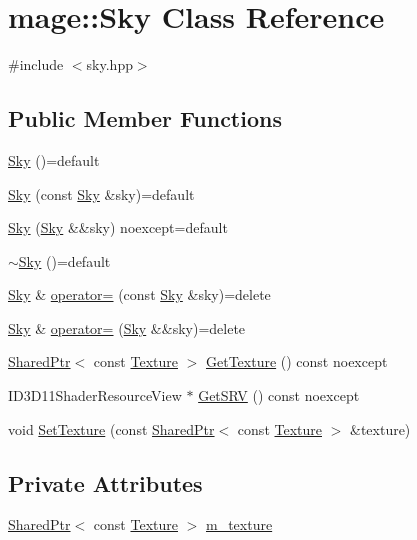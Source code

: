 \hypertarget{classmage_1_1_sky}{}\section{mage\+:\+:Sky Class Reference}
\label{classmage_1_1_sky}


{\ttfamily \#include $<$sky.\+hpp$>$}

\subsection*{Public Member Functions}
\begin{DoxyCompactItemize}
\item 
\hyperlink{classmage_1_1_sky_a4e54074f11814aee89e2554f35e551aa}{Sky} ()=default
\item 
\hyperlink{classmage_1_1_sky_ab041650afed6344cd7874308def5c35c}{Sky} (const \hyperlink{classmage_1_1_sky}{Sky} \&sky)=default
\item 
\hyperlink{classmage_1_1_sky_a2b9a9737f82d1e390c2f50acc2c686e7}{Sky} (\hyperlink{classmage_1_1_sky}{Sky} \&\&sky) noexcept=default
\item 
\hyperlink{classmage_1_1_sky_a42c605bd010c1c6576c3ecf32cd0e962}{$\sim$\+Sky} ()=default
\item 
\hyperlink{classmage_1_1_sky}{Sky} \& \hyperlink{classmage_1_1_sky_a1ed7e2e383a87025347ee63b25f0f544}{operator=} (const \hyperlink{classmage_1_1_sky}{Sky} \&sky)=delete
\item 
\hyperlink{classmage_1_1_sky}{Sky} \& \hyperlink{classmage_1_1_sky_a07e7ad68f471344d06357ea68b82ef84}{operator=} (\hyperlink{classmage_1_1_sky}{Sky} \&\&sky)=delete
\item 
\hyperlink{namespacemage_a1e01ae66713838a7a67d30e44c67703e}{Shared\+Ptr}$<$ const \hyperlink{classmage_1_1_texture}{Texture} $>$ \hyperlink{classmage_1_1_sky_abd49f247b3a376475471310d6396386b}{Get\+Texture} () const noexcept
\item 
I\+D3\+D11\+Shader\+Resource\+View $\ast$ \hyperlink{classmage_1_1_sky_ae72817d4b5015b985234183b6474f5d6}{Get\+S\+RV} () const noexcept
\item 
void \hyperlink{classmage_1_1_sky_aceb336c88ac33bb8490987812414578c}{Set\+Texture} (const \hyperlink{namespacemage_a1e01ae66713838a7a67d30e44c67703e}{Shared\+Ptr}$<$ const \hyperlink{classmage_1_1_texture}{Texture} $>$ \&texture)
\end{DoxyCompactItemize}
\subsection*{Private Attributes}
\begin{DoxyCompactItemize}
\item 
\hyperlink{namespacemage_a1e01ae66713838a7a67d30e44c67703e}{Shared\+Ptr}$<$ const \hyperlink{classmage_1_1_texture}{Texture} $>$ \hyperlink{classmage_1_1_sky_a4f9e8b3658134a04284174c419390a17}{m\+\_\+texture}
\end{DoxyCompactItemize}


